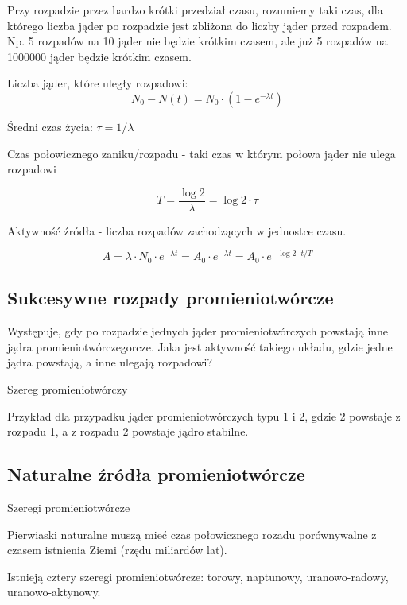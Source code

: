 \documentclass{article}
\begin{document}
Przy rozpadzie przez bardzo krótki przedział czasu, rozumiemy taki czas, dla którego liczba jąder po rozpadzie jest zbliżona do liczby jąder przed rozpadem. Np. 5 rozpadów na 10 jąder nie będzie krótkim czasem, ale już 5 rozpadów na 1000000 jąder będzie krótkim czasem. 

Liczba jąder, które uległy rozpadowi:
\begin{equation}
    N_0 - N(t) = N_0\cdot (1-e^{-\lambda t})
\end{equation}

Średni czas życia: $\tau = 1/\lambda$

Czas połowicznego zaniku\slash rozpadu - taki czas w którym połowa jąder nie ulega rozpadowi

\begin{equation}
    T = \frac{\log{2}}{\lambda} = \log{2} \cdot \tau
\end{equation}

Aktywność źródła - liczba rozpadów zachodzących w jednostce czasu.

\begin{equation}
    A = \lambda \cdot N_0 \cdot e^{-\lambda t} = A_0 \cdot e^{-\lambda t} = A_0 \cdot e^{-\log{2} \cdot t / T}
\end{equation}

\subsection{Sukcesywne rozpady promieniotwórcze}

Występuje, gdy po rozpadzie jednych jąder promieniotwórczych powstają inne jądra promieniotwórczegorcze. Jaka jest aktywność takiego układu, gdzie jedne jądra powstają, a inne ulegają rozpadowi?

Szereg promieniotwórczy

Przykład dla przypadku jąder promieniotwórczych typu 1 i 2, gdzie 2 powstaje z rozpadu 1, a z rozpadu 2 powstaje jądro stabilne.

\subsection{Naturalne źródła promieniotwórcze}

Szeregi promieniotwórcze

Pierwiaski naturalne muszą mieć czas połowicznego rozadu porównywalne z czasem istnienia Ziemi (rzędu miliardów lat).

Istnieją cztery szeregi promieniotwórcze:
torowy, naptunowy, uranowo-radowy, uranowo-aktynowy.
\end{document}
